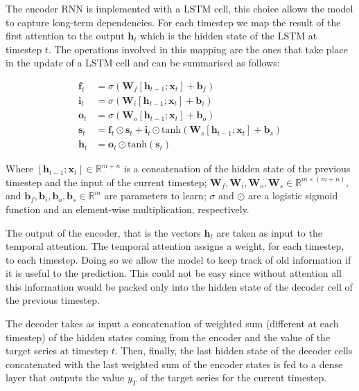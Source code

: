 \documentclass{article}
\begin{document}
The encoder RNN is implemented with a LSTM cell, this choice allows the model
to capture long-term dependencies.
For each timestep we map the result of the first attention to the output
$\mathbf{h}_t$ which is the hidden state of
the LSTM at timestep $t$. The operations involved in this mapping are the ones
that take place in the update of a LSTM
cell and can be summarised as follows:


\begin{equation} \label{eq:lstm}
\begin{split}
\mathbf{f}_t &= \sigma (\mathbf{W}_f[\mathbf{h}_{t-1};\mathbf{x}_t] +
\mathbf{b}_f) \\
\mathbf{i}_t &= \sigma (\mathbf{W}_i[\mathbf{h}_{t-1};\mathbf{x}_t] +
\mathbf{b}_i) \\
\mathbf{o}_t &= \sigma (\mathbf{W}_o[\mathbf{h}_{t-1};\mathbf{x}_t] +
\mathbf{b}_o) \\
\mathbf{s}_t &= \mathbf{f}_t \odot \mathbf{s}_t + \mathbf{i}_t 
				\odot
\text{tanh}(\mathbf{W}_s[\mathbf{h}_{t-1};\mathbf{x}_t] + \mathbf{b}_s) \\
\mathbf{h}_t &= \mathbf{o}_t \odot \text{tanh}(\mathbf{s}_t)
\end{split}
\end{equation}

Where $[\mathbf{h}_{t-1};\mathbf{x}_t] \in \mathbb{R}^{m + n}$ is a
concatenation of the hidden state of the previous
timestep and the input of the current timestep;
$\mathbf{W}_f,\mathbf{W}_i,\mathbf{W}_o,\mathbf{W}_s
\in \mathbb{R}^{m \times(m+n)}$, and $\mathbf{b}_f, \mathbf{b}_i,
\mathbf{b}_o,\mathbf{b}_s \in \mathbb{R}^m$ are
parameters to learn; $\sigma$ and $\odot$ are a logistic sigmoid function and
an element-wise multiplication,
respectively.

The output of the encoder, that is the vectors $\mathbf{h}_t$ are taken as
input to the temporal attention.
The temporal attention assigns a weight, for each timestep, to each timestep.
Doing so we allow the model to keep
track of old information if it is useful to the prediction. This could not be
easy since without attention all this
information would be packed only into the hidden state of the decoder cell of
the previous timestep.

The decoder takes as input a concatenation of weighted sum (different at each
timestep) of the hidden states coming
from the encoder and the value of the target series at timestep $t$. Then,
finally, the last hidden state of the decoder
cells concatenated with the last weighted sum of the encoder states is fed to a
dense layer that outputs the value
$y_T$ of the target series for the current timestep.
\end{document}
